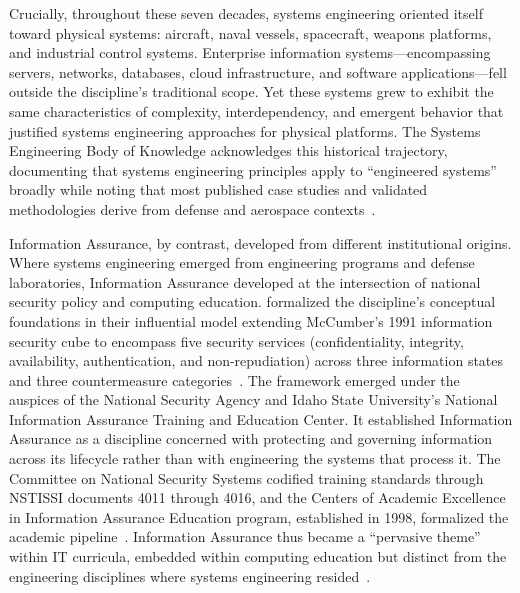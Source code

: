 Crucially, throughout these seven decades, systems engineering oriented itself toward physical systems: aircraft, naval vessels, spacecraft, weapons platforms, and industrial control systems. Enterprise information systems---encompassing servers, networks, databases, cloud infrastructure, and software applications---fell outside the discipline's traditional scope. Yet these systems grew to exhibit the same characteristics of complexity, interdependency, and emergent behavior that justified systems engineering approaches for physical platforms. The Systems Engineering Body of Knowledge acknowledges this historical trajectory, documenting that systems engineering principles apply to ``engineered systems'' broadly while noting that most published case studies and validated methodologies derive from defense and aerospace contexts~\parencite{SEBoK_2024}.

Information Assurance, by contrast, developed from different institutional origins. Where systems engineering emerged from engineering programs and defense laboratories, Information Assurance developed at the intersection of national security policy and computing education. \citeauthor{Maconachy_2001} formalized the discipline's conceptual foundations in their influential model extending McCumber's 1991 information security cube to encompass five security services (confidentiality, integrity, availability, authentication, and non-repudiation) across three information states and three countermeasure categories~\parencite{Maconachy_2001}. The framework emerged under the auspices of the National Security Agency and Idaho State University's National Information Assurance Training and Education Center. It established Information Assurance as a discipline concerned with protecting and governing information across its lifecycle rather than with engineering the systems that process it. The Committee on National Security Systems codified training standards through NSTISSI documents 4011 through 4016, and the Centers of Academic Excellence in Information Assurance Education program, established in 1998, formalized the academic pipeline~\parencite{Dark_2006}. Information Assurance thus became a ``pervasive theme'' within IT curricula, embedded within computing education but distinct from the engineering disciplines where systems engineering resided~\parencite{Dark_2006}.

